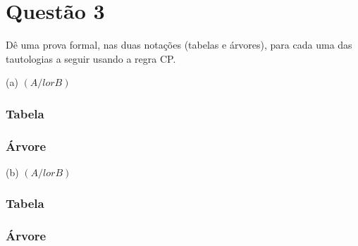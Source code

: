 \section*{Questão 3}

Dê uma prova formal, nas duas notações (tabelas e árvores), para cada uma das tautologias a seguir usando a regra CP.

\noindent
(a) $(A /lor B)$

\subsubsection*{Tabela}
\subsubsection*{Árvore}

\noindent
(b) $(A /lor B)$

\subsubsection*{Tabela}
\subsubsection*{Árvore}
